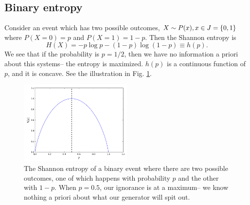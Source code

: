 \subsection*{Binary entropy} Consider an event which has two possible outcomes, $X\sim P(x), x\in J =\{0,1\}$ where $P(X=0)=p$ and $P(X=1)=1-p$. Then the Shannon entropy is
\begin{equation}
    H(X)=-p\log p - (1-p)\log(1-p)\equiv h(p).
\end{equation}
We see that if the probability is $p=1/2$, then we have no information a priori about this systems-- the entropy is maximized. $h(p)$ is a continuous function of $p$, and it is concave. See the illustration in Fig. \ref{fig:binaryshannon}.

\begin{figure}
    \centering
    \includegraphics[width=0.5\textwidth]{2019/01/20190118_binaryshannon.png}
    \caption{The Shannon entropy of a binary event where there are two possible outcomes, one of which happens with probability $p$ and the other with $1-p$. When $p=0.5$, our ignorance is at a maximum-- we know nothing a priori about what our generator will spit out.}
    \label{fig:binaryshannon}
\end{figure}

